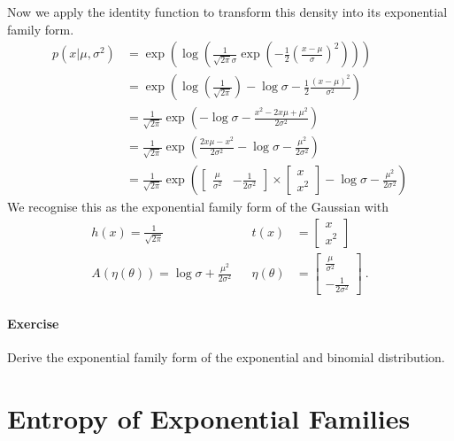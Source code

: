 \documentclass[a4paper, 11pt]{article}
\begin{document}
Now we apply the identity function to transform this density into its exponential family form.
\begin{subequations}
\begin{align}
p(x|\mu, \sigma^{2}) &= \exp \left( \log \left( \frac{1}{\sqrt{2\pi}\sigma} \exp \left(-\frac{1}{2}\left(\frac{x - \mu}{\sigma}\right)^{2}\right) \right) \right) \\
&= \exp \left( \log \left( \frac{1}{\sqrt{2\pi}} \right) - \log \sigma -\frac{1}{2}\frac{(x - \mu)^{2}}{\sigma^{2}}\right) \\
&= \frac{1}{\sqrt{2\pi}}\exp \left( - \log \sigma -\frac{x^{2} - 2x\mu + \mu^{2}}{2\sigma^{2}}\right) \\
&= \frac{1}{\sqrt{2\pi}} \exp \left(\frac{2x\mu -x^{2}}{2\sigma^{2}} - \log\sigma - \frac{\mu^{2}}{2\sigma^{2}}\right) \\
&= \frac{1}{\sqrt{2\pi}} \exp \left( 
\begin{bmatrix} \frac{\mu}{\sigma^{2}} & -\frac{1}{2\sigma^{2}} \end{bmatrix} \times 
\begin{bmatrix} x \\ x^{2} \end{bmatrix}
- \log\sigma - \frac{\mu^{2}}{2\sigma^{2}}\right)
\end{align}
\end{subequations}
We recognise this as the exponential family form of the Gaussian with
\begin{equation}
\begin{aligned}
h(x) = \frac{1}{\sqrt{2\pi}} && t(x) &= \begin{bmatrix} x \\ x^{2} \end{bmatrix} \\
A(\eta(\theta)) = \log \sigma + \frac{\mu^{2}}{2\sigma^{2}} && \eta(\theta) &= \begin{bmatrix} \frac{\mu}{\sigma^{2}} \\ -\frac{1}{2\sigma^{2}} \end{bmatrix} \ .
\end{aligned}
\end{equation}

\paragraph{Exercise} Derive the exponential family form of the exponential and binomial distribution.

\section{Entropy of Exponential Families}
\end{document}

